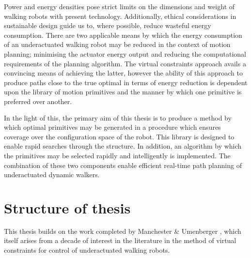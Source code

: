 Power and energy densities pose strict limits on the dimensions and weight of walking robots with present technology. Additionally, ethical considerations in sustainable design guide us to, where possible, reduce wasteful energy consumption. There are two applicable means by which the energy consumption of an underactuated walking robot may be reduced in the context of motion planning; minimising the actuator energy output and reducing the computational requirements of the planning algorithm. The virtual constraints approach avails a convincing means of achieving the latter, however the ability of this approach to produce paths close to the true optimal in terms of energy reduction is dependent upon the library of motion primitives and the manner by which one primitive is preferred over another.

In the light of this, the primary aim of this thesis is to produce a method by which optimal primitives may be generated in a procedure which ensures coverage over the configuration space of the robot. This library is designed to enable rapid searches through the structure. In addition, an algorithm by which the primitives may be selected rapidly and intelligently is implemented. The combination of these two components enable efficient real-time path planning of underactuated dynamic walkers.

\section{Structure of thesis}
This thesis builds on the work completed by Manchester \& Umenberger \cite{manchester13planning}, which itself arises from a decade of interest in the literature in the method of virtual constraints for control of underactuated walking robots.

